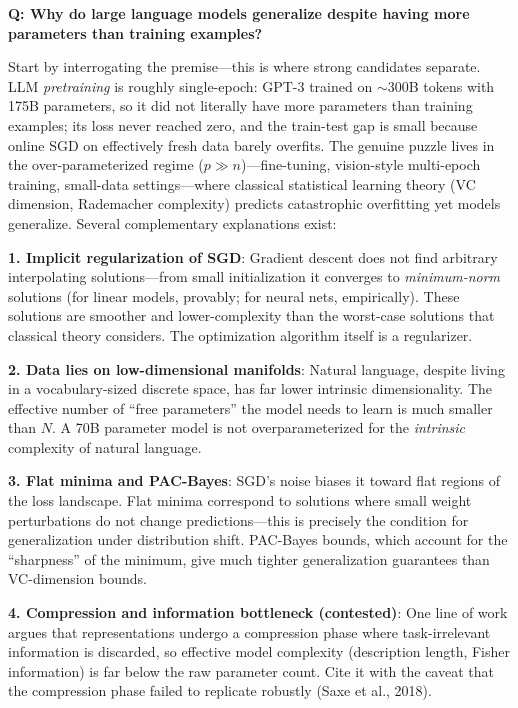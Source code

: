 \begin{interviewq}
\textbf{Q: Why do large language models generalize despite having more parameters than training examples?}

 \quad {} \quad \badgefreq{\freqmed}

\stronganswer
Start by interrogating the premise---this is where strong candidates separate. LLM \textit{pretraining} is roughly single-epoch: GPT-3 trained on $\sim$300B tokens with 175B parameters, so it did not literally have more parameters than training examples; its loss never reached zero, and the train-test gap is small because online SGD on effectively fresh data barely overfits. The genuine puzzle lives in the over-parameterized regime ($p \gg n$)---fine-tuning, vision-style multi-epoch training, small-data settings---where classical statistical learning theory (VC dimension, Rademacher complexity) predicts catastrophic overfitting yet models generalize. Several complementary explanations exist:

\textbf{1. Implicit regularization of SGD}: Gradient descent does not find arbitrary interpolating solutions---from small initialization it converges to \textit{minimum-norm} solutions (for linear models, provably; for neural nets, empirically). These solutions are smoother and lower-complexity than the worst-case solutions that classical theory considers. The optimization algorithm itself is a regularizer.

\textbf{2. Data lies on low-dimensional manifolds}: Natural language, despite living in a vocabulary-sized discrete space, has far lower intrinsic dimensionality. The effective number of ``free parameters'' the model needs to learn is much smaller than $N$. A 70B parameter model is not overparameterized for the \textit{intrinsic} complexity of natural language.

\textbf{3. Flat minima and PAC-Bayes}: SGD's noise biases it toward flat regions of the loss landscape. Flat minima correspond to solutions where small weight perturbations do not change predictions---this is precisely the condition for generalization under distribution shift. PAC-Bayes bounds, which account for the ``sharpness'' of the minimum, give much tighter generalization guarantees than VC-dimension bounds.

\textbf{4. Compression and information bottleneck (contested)}: One line of work argues that representations undergo a compression phase where task-irrelevant information is discarded, so effective model complexity (description length, Fisher information) is far below the raw parameter count. Cite it with the caveat that the compression phase failed to replicate robustly (Saxe et al., 2018).


\end{interviewq}
